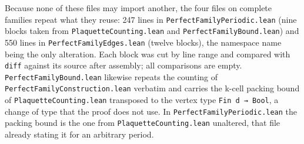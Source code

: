\documentclass[11pt,a4paper]{article}
\theoremstyle{named}
\begin{document}
Because none of these files may import another, the four files on complete families repeat what they reuse: 247 lines in \texttt{PerfectFamilyPeriodic.\allowbreak{}lean} (nine blocks taken from \texttt{PlaquetteCounting.\allowbreak{}lean} and \texttt{PerfectFamilyBound.\allowbreak{}lean}) and 550 lines in \texttt{PerfectFamilyEdges.\allowbreak{}lean} (twelve blocks), the namespace name being the only alteration. Each block was cut by line range and compared with \texttt{diff} against its source after assembly; all comparisons are empty. \texttt{PerfectFamilyBound.\allowbreak{}lean} likewise repeats the counting of \texttt{PerfectFamilyConstruction.\allowbreak{}lean} verbatim and carries the k-cell packing bound of \texttt{PlaquetteCounting.\allowbreak{}lean} transposed to the vertex type \texttt{Fin\ \allowbreak{}d\ \allowbreak{}→\ \allowbreak{}Bool}, a change of type that the proof does not use. In \texttt{PerfectFamilyPeriodic.\allowbreak{}lean} the packing bound is the one from \texttt{PlaquetteCounting.\allowbreak{}lean} unaltered, that file already stating it for an arbitrary period.
\end{document}

